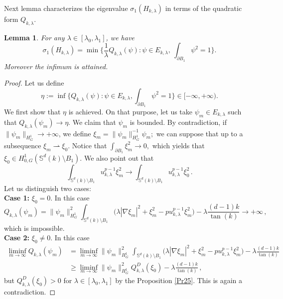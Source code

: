 \documentclass[reqno]{amsart}
\newtheorem{lemma}[theorem]{Lemma}
\numberwithin{equation}{section}
\newenvironment{key words}{\textbf{Keywords}\mbox{  }}{ }
\begin{document}
Next lemma characterizes the eigenvalue $\sigma_{1}(H_{k, \lambda})$ in terms of the quadratic form $Q_{k,\lambda}$.
\begin{lemma} \label{le43}
For any $\lambda\in[\lambda_{0},\lambda_{1}]$, we have
\[\sigma_{1}(H_{k, \lambda})= \min \Bigg\{\frac{1}{\lambda}Q_{k, \lambda}(\psi): \psi\in E_{k, \lambda},~\int_{\partial B_1}\psi^{2}=1\Bigg\}.\]  Moreover the infimum is attained.
 \end{lemma}
\begin{proof}
Let us define
\begin{equation}\label{eq323}
  \eta:=\inf\Bigg\{Q_{k, \lambda}(\psi):\psi\in E_{k,\lambda},\int_{\partial B_1}\psi^{2}= 1 \Bigg\} \in [-\infty, +\infty).
\end{equation}
We first show that $\eta$ is achieved. On that purpose, let us take $\psi_{m}\in E_{k,\lambda}$ such that $Q_{k, \lambda}(\psi_m)\rightarrow\eta .$
We claim that $\psi_{m}$ is bounded. By contradiction, if $\|\psi_{m}\|_{H_{G}^1}\rightarrow +\infty$, we define $\xi_{m}=\|\psi_{m}\|_{H_{G}^1}^{-1}\psi_{m};$ we can suppose that up to a subsequence $\xi_{m}\rightharpoonup \xi_{0}.$ Notice that $\int_{\partial B_1}\xi_{m}^{2}\rightarrow0,$ which yields that $\xi_{0}\in H^{1}_{0,G}(\mathbb{S}^{d}(k)\setminus B_{1}).$ We also point out that
\[\int_{\mathbb{S}^{d}(k)\setminus B_{1}}u_{k,\lambda}^{p-1}\xi_{m}^{2}\rightarrow\int_{\mathbb{S}^{d}(k)\setminus B_{1}}u_{k,\lambda}^{p-1}\xi_{0}^{2}\,.\]
Let us distinguish two cases:\\
\textbf{Case 1:} $\xi_{0}=0.$ In this case
\[Q_{k, \lambda}(\psi_m)=\|\psi_{m}\|_{H_{G}^1}^{2}\int_{\mathbb{S}^{d}(k)\setminus B_{1}}\big(\lambda|\nabla\xi_{m}|^{2}+\xi_{m}^{2}-pu_{k,\lambda}^{p-1}\xi_{m}^{2}\big)-\lambda\frac{(d-1)k}{\tan(k)}\rightarrow+\infty\,,\]
which is impossible.\\
\textbf{Case 2:} $\xi_{0}\neq 0.$ In this case
\begin{align*}
\mathop {\liminf}\limits_{m\rightarrow\infty}Q_{k, \lambda}(\psi_m)&=\mathop {\liminf}\limits_{m\rightarrow\infty}
\|\psi_{m}\|_{H_{G}^1}^{2}\int_{\mathbb{S}^{d}(k)\setminus B_{1}}\big(\lambda|\nabla\xi_{m}|^{2}+\xi_{m}^{2}-pu_{k,\lambda}^{p-1}\xi_{m}^{2}\big)-\lambda\frac{(d-1)k}{\tan(k)}\\
&\geq\mathop {\liminf}\limits_{m\rightarrow\infty}\|\psi_{m}\|_{H_{G}^1}^{2}Q_{k, \lambda}^D(\xi_{0})-\lambda\frac{(d-1)k}{\tan(k)}\,,
\end{align*}
but $Q_{k, \lambda}^D(\xi_{0})>0$ for $\lambda\in[\lambda_{0},\lambda_{1}]$ by the Proposition \ref{Pr25}. This is again a contradiction.


\end{proof}
\end{document}
